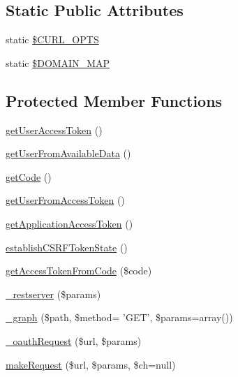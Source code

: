 \subsection*{Static Public Attributes}
\begin{DoxyCompactItemize}
\item 
static \hyperlink{class_base_facebook_af857bf8aaa1bbaf0798c8e44eeb05455}{\$\-C\-U\-R\-L\-\_\-\-O\-P\-T\-S}
\item 
static \hyperlink{class_base_facebook_a3d9af40cffd892f8e26b26464188297d}{\$\-D\-O\-M\-A\-I\-N\-\_\-\-M\-A\-P}
\end{DoxyCompactItemize}
\subsection*{Protected Member Functions}
\begin{DoxyCompactItemize}
\item 
\hyperlink{class_base_facebook_a13460ccc9f833e624e11f1988ccf9923}{get\-User\-Access\-Token} ()
\item 
\hyperlink{class_base_facebook_a0cf00b33e34f3d1288963a0270bbe4b9}{get\-User\-From\-Available\-Data} ()
\item 
\hyperlink{class_base_facebook_ab5e24da53b4a0d0848b18c1e832f47ff}{get\-Code} ()
\item 
\hyperlink{class_base_facebook_abb0066c65d21263162826abb97fabff9}{get\-User\-From\-Access\-Token} ()
\item 
\hyperlink{class_base_facebook_aa9aad274cdcdf95d01e679ad39ab024e}{get\-Application\-Access\-Token} ()
\item 
\hyperlink{class_base_facebook_a579528d3b5dd4a53d0c83c9de50858e1}{establish\-C\-S\-R\-F\-Token\-State} ()
\item 
\hyperlink{class_base_facebook_aa1a0bcc231e5fe8138daa8f602ba8dcc}{get\-Access\-Token\-From\-Code} (\$code)
\item 
\hyperlink{class_base_facebook_a6285ac6151ea12fe9ebb5cb5df729db4}{\-\_\-restserver} (\$params)
\item 
\hyperlink{class_base_facebook_a4344aefe9fb93fcbad8db2d7f9d7b2e8}{\-\_\-graph} (\$path, \$method= 'G\-E\-T', \$params=array())
\item 
\hyperlink{class_base_facebook_a1e520893c45507103d5722f6e98b5855}{\-\_\-oauth\-Request} (\$url, \$params)
\item 
\hyperlink{class_base_facebook_a43349b0f9d884f1357591ab9683ea651}{make\-Request} (\$url, \$params, \$ch=null)
\item 

\end{DoxyCompactItemize}

